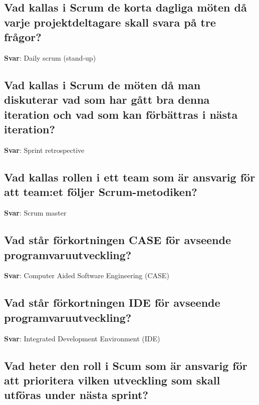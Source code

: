 \documentclass[a4paper,11pt,oneside]{article}
\begin{document}
\begin{sloppypar}
\subsection{Vad kallas i Scrum de korta dagliga m\"oten d\r{a} varje projektdeltagare skall svara p\r{a} tre fr\r{a}gor?}

\label{q:44:sa:sv:True}

\textbf{Svar}: Daily scrum (stand-up)



\subsection{Vad kallas i Scrum de m\"oten d\r{a} man diskuterar vad som har g\r{a}tt bra denna iteration och vad som kan f\"orb\"attras i n\"asta iteration?}

\label{q:45:sa:sv:True}

\textbf{Svar}: Sprint retrospective



\subsection{Vad kallas rollen i ett team som \"ar ansvarig f\"or att team:et f\"oljer Scrum-metodiken?}

\label{q:46:sa:sv:True}

\textbf{Svar}: Scrum master



\subsection{Vad st\r{a}r f\"orkortningen CASE f\"or avseende programvaruutveckling?}

\label{q:47:sa:sv:True}

\textbf{Svar}: Computer Aided Software Engineering (CASE)



\subsection{Vad st\r{a}r f\"orkortningen IDE f\"or avseende programvaruutveckling?}

\label{q:48:sa:sv:True}

\textbf{Svar}: Integrated Development Environment (IDE)



\subsection{Vad heter den roll i Scum som \"ar ansvarig f\"or att prioritera vilken utveckling som skall utf\"oras under n\"asta sprint?}


\end{sloppypar}
\end{document}
